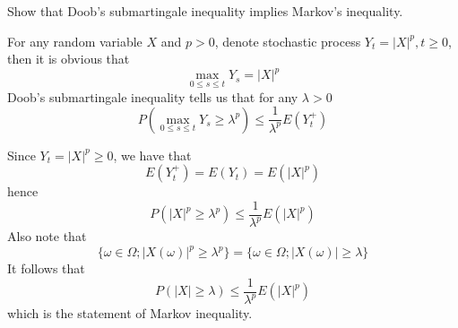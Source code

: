     \problem
    \begin{question}
        Show that Doob's submartingale inequality implies Markov's inequality.
    \end{question}
    For any random variable $X$ and $p>0$, denote stochastic process
    $Y_t=|X|^p,t\geq 0$,
    then it is obvious that
    \[\max_{0\leq s\leq t}Y_s=|X|^p\]
    Doob's submartingale inequality tells us that
    for any $\lambda>0$
    \[P\left(\max_{0\leq s\leq t}Y_s\geq\lambda^p\right)
    \leq\frac{1}{\lambda^p}E(Y_t^+)\]

    Since $Y_t=|X|^p\geq 0$, we have that
    \[E(Y_t^+)=E(Y_t)=E(|X|^p)\]
    hence
    \[P(|X|^p\geq\lambda^p)\leq\frac{1}{\lambda^p}E(|X|^p)\]
    Also note that
    \[\{\omega\in\Omega;|X(\omega)|^p\geq\lambda^p\}
    =\{\omega\in\Omega;|X(\omega)|\geq\lambda\}\]
    It follows that
    \[P(|X|\geq\lambda)\leq\frac{1}{\lambda^p}E(|X|^p)\]
    which is the statement of Markov inequality.

